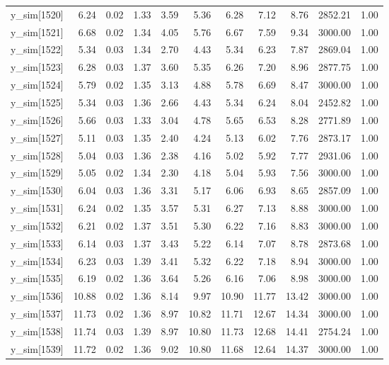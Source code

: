 \begin{table}[ht]
\begin{tabular}{rrrrrrrrrrr}
  y\_sim[1520] & 6.24 & 0.02 & 1.33 & 3.59 & 5.36 & 6.28 & 7.12 & 8.76 & 2852.21 & 1.00 \\ 
  y\_sim[1521] & 6.68 & 0.02 & 1.34 & 4.05 & 5.76 & 6.67 & 7.59 & 9.34 & 3000.00 & 1.00 \\ 
  y\_sim[1522] & 5.34 & 0.03 & 1.34 & 2.70 & 4.43 & 5.34 & 6.23 & 7.87 & 2869.04 & 1.00 \\ 
  y\_sim[1523] & 6.28 & 0.03 & 1.37 & 3.60 & 5.35 & 6.26 & 7.20 & 8.96 & 2877.75 & 1.00 \\ 
  y\_sim[1524] & 5.79 & 0.02 & 1.35 & 3.13 & 4.88 & 5.78 & 6.69 & 8.47 & 3000.00 & 1.00 \\ 
  y\_sim[1525] & 5.34 & 0.03 & 1.36 & 2.66 & 4.43 & 5.34 & 6.24 & 8.04 & 2452.82 & 1.00 \\ 
  y\_sim[1526] & 5.66 & 0.03 & 1.33 & 3.04 & 4.78 & 5.65 & 6.53 & 8.28 & 2771.89 & 1.00 \\ 
  y\_sim[1527] & 5.11 & 0.03 & 1.35 & 2.40 & 4.24 & 5.13 & 6.02 & 7.76 & 2873.17 & 1.00 \\ 
  y\_sim[1528] & 5.04 & 0.03 & 1.36 & 2.38 & 4.16 & 5.02 & 5.92 & 7.77 & 2931.06 & 1.00 \\ 
  y\_sim[1529] & 5.05 & 0.02 & 1.34 & 2.30 & 4.18 & 5.04 & 5.93 & 7.56 & 3000.00 & 1.00 \\ 
  y\_sim[1530] & 6.04 & 0.03 & 1.36 & 3.31 & 5.17 & 6.06 & 6.93 & 8.65 & 2857.09 & 1.00 \\ 
  y\_sim[1531] & 6.24 & 0.02 & 1.35 & 3.57 & 5.31 & 6.27 & 7.13 & 8.88 & 3000.00 & 1.00 \\ 
  y\_sim[1532] & 6.21 & 0.02 & 1.37 & 3.51 & 5.30 & 6.22 & 7.16 & 8.83 & 3000.00 & 1.00 \\ 
  y\_sim[1533] & 6.14 & 0.03 & 1.37 & 3.43 & 5.22 & 6.14 & 7.07 & 8.78 & 2873.68 & 1.00 \\ 
  y\_sim[1534] & 6.23 & 0.03 & 1.39 & 3.41 & 5.32 & 6.22 & 7.18 & 8.94 & 3000.00 & 1.00 \\ 
  y\_sim[1535] & 6.19 & 0.02 & 1.36 & 3.64 & 5.26 & 6.16 & 7.06 & 8.98 & 3000.00 & 1.00 \\ 
  y\_sim[1536] & 10.88 & 0.02 & 1.36 & 8.14 & 9.97 & 10.90 & 11.77 & 13.42 & 3000.00 & 1.00 \\ 
  y\_sim[1537] & 11.73 & 0.02 & 1.36 & 8.97 & 10.82 & 11.71 & 12.67 & 14.34 & 3000.00 & 1.00 \\ 
  y\_sim[1538] & 11.74 & 0.03 & 1.39 & 8.97 & 10.80 & 11.73 & 12.68 & 14.41 & 2754.24 & 1.00 \\ 
  y\_sim[1539] & 11.72 & 0.02 & 1.36 & 9.02 & 10.80 & 11.68 & 12.64 & 14.37 & 3000.00 & 1.00 \\ 

\end{tabular}
\end{table}
